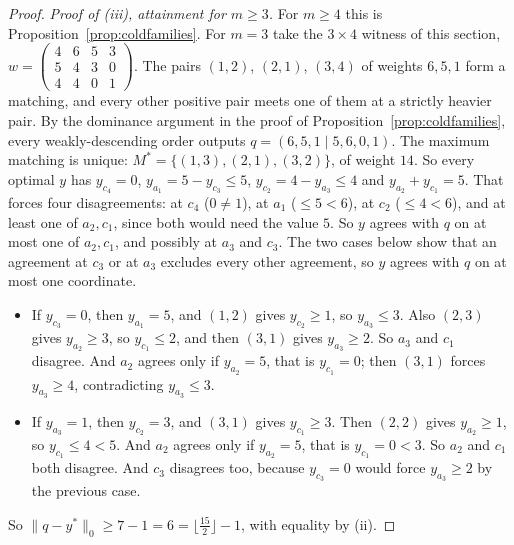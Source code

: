 \begin{proof}
\emph{Proof of (iii), attainment for $m \ge 3$.} For $m \ge 4$ this is
Proposition~\ref{prop:coldfamilies}. For $m = 3$ take the $3\times4$ witness of this section,
$w = \left(\begin{smallmatrix} 4&6&5&3\\ 5&4&3&0\\ 4&4&0&1 \end{smallmatrix}\right)$. The pairs
$(1,2)$, $(2,1)$, $(3,4)$ of weights $6, 5, 1$ form a matching, and every other positive pair
meets one of them at a strictly heavier pair. By the dominance argument in the proof of
Proposition~\ref{prop:coldfamilies}, every weakly-descending order outputs
$q = (6,5,1 \mid 5,6,0,1)$. The maximum matching is unique:
$M^* = \{(1,3),(2,1),(3,2)\}$, of weight $14$. So every optimal $y$ has $y_{c_4} = 0$,
$y_{a_1} = 5 - y_{c_3} \le 5$, $y_{c_2} = 4 - y_{a_3} \le 4$ and $y_{a_2}+y_{c_1} = 5$. That
forces four disagreements: at $c_4$ ($0 \ne 1$), at $a_1$ ($\le 5 < 6$), at $c_2$
($\le 4 < 6$), and at least one of $a_2, c_1$, since both would need the value $5$. So $y$ agrees
with $q$ on at most one of $a_2, c_1$, and possibly at $a_3$ and $c_3$. The two cases below show
that an agreement at $c_3$ or at $a_3$ excludes every other agreement, so $y$ agrees with $q$
on at most one coordinate.
\begin{itemize}
\item If $y_{c_3} = 0$, then $y_{a_1} = 5$, and $(1,2)$ gives $y_{c_2} \ge 1$, so
  $y_{a_3} \le 3$. Also $(2,3)$ gives $y_{a_2} \ge 3$, so $y_{c_1} \le 2$, and then $(3,1)$
  gives $y_{a_3} \ge 2$. So $a_3$ and $c_1$ disagree. And $a_2$ agrees only if $y_{a_2} = 5$,
  that is $y_{c_1} = 0$; then $(3,1)$ forces $y_{a_3} \ge 4$, contradicting $y_{a_3} \le 3$.
\item If $y_{a_3} = 1$, then $y_{c_2} = 3$, and $(3,1)$ gives $y_{c_1} \ge 3$. Then $(2,2)$ gives
  $y_{a_2} \ge 1$, so $y_{c_1} \le 4 < 5$. And $a_2$ agrees only if $y_{a_2} = 5$, that is
  $y_{c_1} = 0 < 3$. So $a_2$ and $c_1$ both disagree. And $c_3$ disagrees too, because
  $y_{c_3} = 0$ would force $y_{a_3} \ge 2$ by the previous case.
\end{itemize}
So $\|q-y^*\|_0 \ge 7 - 1 = 6 = \lfloor \tfrac{15}{2} \rfloor - 1$, with equality by (ii).
\end{proof}

